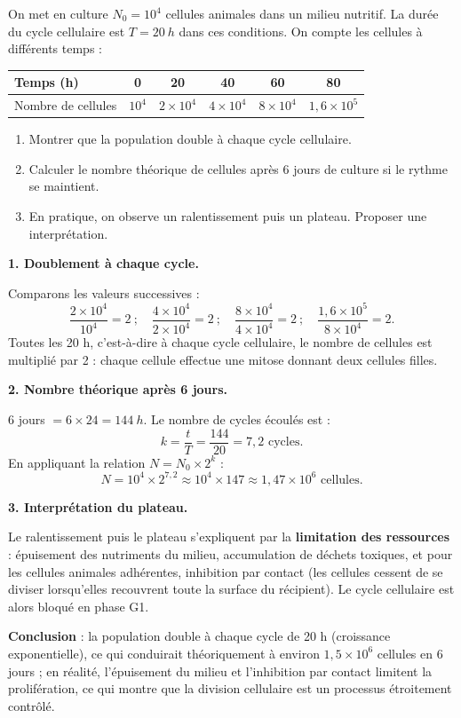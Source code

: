 \documentclass[11pt]{article}
\newcommand{\cle}[1]{{\popxbold\color{popdark}#1}}
\begin{document}
\begin{exoresolu}
On met en culture $N_0 = 10^{4}$ cellules animales dans un milieu nutritif. La durée du cycle cellulaire est $T = \SI{20}{h}$ dans ces conditions. On compte les cellules à différents temps :
\begin{center}
\begin{tabular}{|l|c|c|c|c|c|}
\hline
\rowcolor{popblueL} Temps (h) & 0 & 20 & 40 & 60 & 80 \\
\hline Nombre de cellules & $10^{4}$ & $2 \times 10^{4}$ & $4 \times 10^{4}$ & $8 \times 10^{4}$ & $1{,}6 \times 10^{5}$ \\
\hline
\end{tabular}
\end{center}
\begin{enumerate}
\item Montrer que la population double à chaque cycle cellulaire.
\item Calculer le nombre théorique de cellules après 6 jours de culture si le rythme se maintient.
\item En pratique, on observe un ralentissement puis un plateau. Proposer une interprétation.
\end{enumerate}
\tcblower
\textbf{1. Doublement à chaque cycle.}

Comparons les valeurs successives :
\[ \frac{2 \times 10^{4}}{10^{4}} = 2 \ ; \quad \frac{4 \times 10^{4}}{2 \times 10^{4}} = 2 \ ; \quad \frac{8 \times 10^{4}}{4 \times 10^{4}} = 2 \ ; \quad \frac{1{,}6 \times 10^{5}}{8 \times 10^{4}} = 2. \]
Toutes les 20 h, c'est-à-dire à chaque cycle cellulaire, le nombre de cellules est multiplié par 2 : chaque cellule effectue une mitose donnant deux cellules filles.

\textbf{2. Nombre théorique après 6 jours.}

6 jours $= 6 \times 24 = \SI{144}{h}$. Le nombre de cycles écoulés est :
\[ k = \frac{t}{T} = \frac{144}{20} = 7{,}2 \text{ cycles.} \]
En appliquant la relation $N = N_0 \times 2^{k}$ :
\[ N = 10^{4} \times 2^{7{,}2} \approx 10^{4} \times 147 \approx 1{,}47 \times 10^{6} \text{ cellules.} \]

\textbf{3. Interprétation du plateau.}

Le ralentissement puis le plateau s'expliquent par la \textbf{limitation des ressources} : épuisement des nutriments du milieu, accumulation de déchets toxiques, et pour les cellules animales adhérentes, \cle{inhibition par contact} (les cellules cessent de se diviser lorsqu'elles recouvrent toute la surface du récipient). Le cycle cellulaire est alors bloqué en phase G1.

\textbf{Conclusion} : la population double à chaque cycle de 20 h (croissance exponentielle), ce qui conduirait théoriquement à environ $1{,}5 \times 10^{6}$ cellules en 6 jours ; en réalité, l'épuisement du milieu et l'inhibition par contact limitent la prolifération, ce qui montre que la division cellulaire est un processus étroitement contrôlé.
\end{exoresolu}
\end{document}
